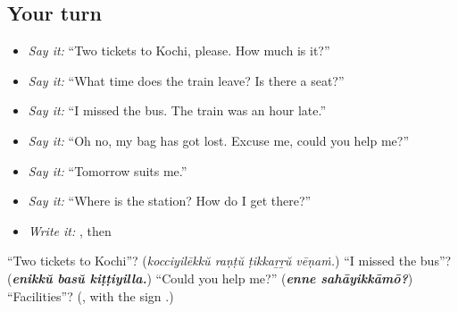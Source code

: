 \subsection*{Your turn}
\begin{itemize}
\raggedright
  \item \emph{Say it:} \textquotedblleft{}Two tickets to Kochi, please. How much is it?\textquotedblright{}
  \item \emph{Say it:} \textquotedblleft{}What time does the train leave? Is there a seat?\textquotedblright{}
  \item \emph{Say it:} \textquotedblleft{}I missed the bus. The train was an hour late.\textquotedblright{}
  \item \emph{Say it:} \textquotedblleft{}Oh no, my bag has got lost. Excuse me, could you help me?\textquotedblright{}
  \item \emph{Say it:} \textquotedblleft{}Tomorrow suits me.\textquotedblright{}
  \item \emph{Say it:} \textquotedblleft{}Where is the station? How do I get there?\textquotedblright{}
  \item \emph{Write it:} \textbf{}, then \textbf{}
\end{itemize}

\begin{tcolorbox}[breakable,colback=teal!4,colframe=teal!35!black,title={Before you move on}]
\textquotedblleft{}Two tickets to Kochi\textquotedblright{}? (\emph{kocciyilēkkŭ raṇṭŭ ṭikkaṟṟŭ vēṇaṁ.}) \textquotedblleft{}I missed the bus\textquotedblright{}? (\emph{\textbf{enikkŭ basŭ kiṭṭiyilla.}}) \textquotedblleft{}Could you help me?\textquotedblright{} (\emph{\textbf{enne sahāyikkāmō?}}) \textquotedblleft{}Facilities\textquotedblright{}? (\textbf{}, with the sign \textbf{}.)
\end{tcolorbox}
